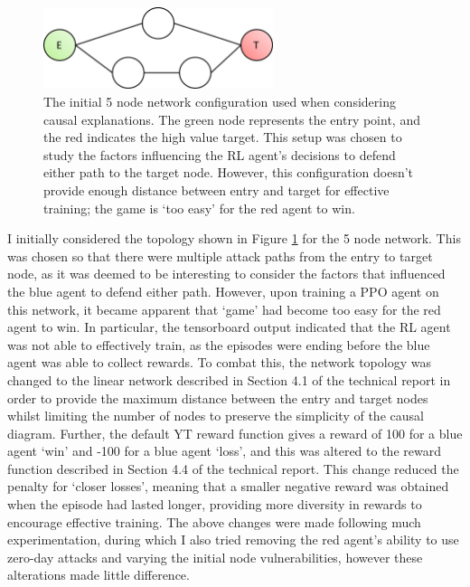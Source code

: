 \documentclass{article}
\begin{document}
\begin{figure}[htp]
    \centering
    \includegraphics[width=0.6\textwidth]{Images/Initial 5pc.png}
    \caption{The initial 5 node network configuration used when considering causal explanations. The green node represents the entry point, and the red indicates the high value target. This setup was chosen to study the factors influencing the RL agent's decisions to defend either path to the target node. However, this configuration doesn't provide enough distance between entry and target for effective training; the game is `too easy' for the red agent to win.}
    \label{fig:linear_5PC_diagram}
\end{figure}

I initially considered the topology shown in Figure \ref{fig:linear_5PC_diagram} for the 5 node network. This was chosen so that there were multiple attack paths from the entry to target node, as it was deemed to be interesting to consider the factors that influenced the blue agent to defend either path. However, upon training a PPO agent on this network, it became apparent that `game' had become too easy for the red agent to win. In particular, the tensorboard output indicated that the RL agent was not able to effectively train, as the episodes were ending before the blue agent was able to collect rewards. To combat this, the network topology was changed to the linear network described in Section 4.1 of the technical report in order to provide the maximum distance between the entry and target nodes whilst limiting the number of nodes to preserve the simplicity of the causal diagram. Further, the default YT reward function gives a reward of 100 for a blue agent `win' and -100 for a blue agent `loss', and this was altered to the reward function described in Section 4.4 of the technical report. This change reduced the penalty for `closer losses', meaning that a smaller negative reward was obtained when the episode had lasted longer, providing more diversity in rewards to encourage effective training. The above changes were made following much experimentation, during which I also tried removing the red agent's ability to use zero-day attacks and varying the initial node vulnerabilities, however these alterations made little difference.
\end{document}
